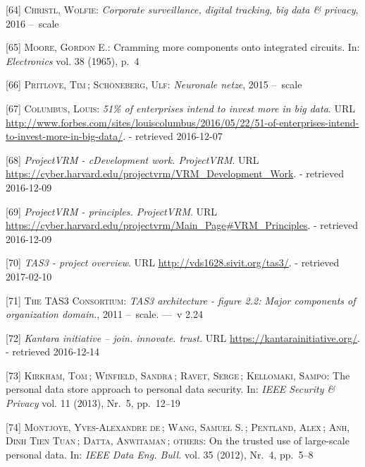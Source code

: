 \documentclass[12pt,english,a4paper,titlepage,cleardoublepage=empty,dottedtoc]{report}
\begin{document}
\hypertarget{ref-video_2016_corporate-surveillance-digital-tracking-big-data-privacy}{}
{[}64{]} \textsc{Christl, Wolfie}: \emph{Corporate surveillance, digital
tracking, big data \& privacy}, 2016 --~scale

\hypertarget{ref-paper_1965_moors-law}{}
{[}65{]} \textsc{Moore, Gordon E.}: Cramming more components onto
integrated circuits. In: \emph{Electronics} vol. 38 (1965), p.~4

\hypertarget{ref-podcast_2015_cre-neuronale-netze}{}
{[}66{]} \textsc{Pritlove, Tim}\,; \textsc{Schöneberg, Ulf}:
\emph{Neuronale netze}, 2015 --~scale

\hypertarget{ref-web_2016_industries-intention-to-invest-in-big-data}{}
{[}67{]} \textsc{Columbus, Louis}: \emph{51\% of enterprises intend to
invest more in big data}. URL
\url{http://www.forbes.com/sites/louiscolumbus/2016/05/22/51-of-enterprises-intend-to-invest-more-in-big-data/}.
- retrieved 2016-12-07

\hypertarget{ref-web_2016_projectvrm_development-work}{}
{[}68{]} \emph{ProjectVRM - cDevelopment work. ProjectVRM}. URL
\url{https://cyber.harvard.edu/projectvrm/VRM_Development_Work}. -
retrieved 2016-12-09

\hypertarget{ref-web_2016_projectvrm_principles}{}
{[}69{]} \emph{ProjectVRM - principles. ProjectVRM}. URL
\url{https://cyber.harvard.edu/projectvrm/Main_Page\#VRM_Principles}. -
retrieved 2016-12-09

\hypertarget{ref-web_2011_tas3-project}{}
{[}70{]} \emph{TAS3 - project overview}. URL
\url{http://vds1628.sivit.org/tas3/}. - retrieved 2017-02-10

\hypertarget{ref-graphic_2011_architecture_components-of-organization-domain}{}
{[}71{]} \textsc{The TAS3 Consortium}: \emph{TAS3 architecture - figure
2.2: Major components of organization domain.}, 2011 --~scale. ---~v
2.24

\hypertarget{ref-web_kantara-initiative}{}
{[}72{]} \emph{Kantara initiative -- join. innovate. trust.} URL
\url{https://kantarainitiative.org/}. - retrieved 2016-12-14

\hypertarget{ref-paper_2014_personal-data-store-approach}{}
{[}73{]} \textsc{Kirkham, Tom}\,; \textsc{Winfield, Sandra}\,;
\textsc{Ravet, Serge}\,; \textsc{Kellomaki, Sampo}: The personal data
store approach to personal data security. In: \emph{IEEE Security \&
Privacy} vol. 11 (2013), Nr.~5, pp.~12--19

\hypertarget{ref-paper_2012_openpds_on-trusted-use-of-large-scale-personal-data}{}
{[}74{]} \textsc{Montjoye, Yves-Alexandre de}\,; \textsc{Wang, Samuel
S.}\,; \textsc{Pentland, Alex}\,; \textsc{Anh, Dinh Tien Tuan}\,;
\textsc{Datta, Anwitaman}\,; \textsc{others}: On the trusted use of
large-scale personal data. In: \emph{IEEE Data Eng. Bull.} vol. 35
(2012), Nr.~4, pp.~5--8
\end{document}
